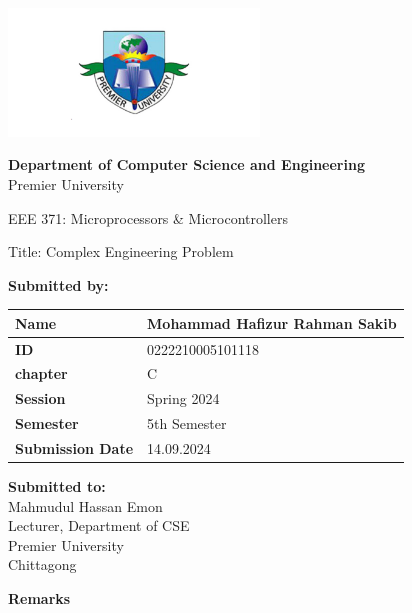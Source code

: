 \documentclass{scrreprt}
\renewcommand{\arraystretch}{1.5}
\begin{document}
\begin{titlepage}
    \centering
    \includegraphics[width=0.5\textwidth]{./logo.png} 
    \vspace{1cm}

    \textbf{Department of Computer Science and Engineering}\\
    Premier University
    \vspace{1cm}

    \huge \textnormal{EEE 371: Microprocessors \& Microcontrollers }
    \vspace{1in} 

    \Large \textnormal{Title: Complex Engineering Problem}
    \vspace{0.5in} 

    \large
    \textbf{Submitted by:}
    \vspace{0.5cm}

    \renewcommand{\arraystretch}{1.5} 
    \begin{tabular}{|p{}|p{}|}
        \hline
        \textbf{Name} & Mohammad Hafizur Rahman Sakib \\
        \hline
        \textbf{ID} & 0222210005101118 \\
        \hline
        \textbf{chapter} & C \\
        \hline
        \textbf{Session} & Spring 2024 \\
        \hline
        \textbf{Semester} & 5th Semester \\
        \hline
        \textbf{Submission Date} & 14.09.2024 \\
        \hline
    \end{tabular}
    \vspace{1cm}

    \begin{minipage}[t]{0.48\textwidth}
        \textbf{Submitted to:}\\
        Mahmudul Hassan Emon\\
        Lecturer, Department of CSE\\
        Premier University\\
        Chittagong
    \end{minipage}%
    \hfill
    \begin{minipage}[t]{0.48\textwidth}
        \raggedleft
        \textbf{Remarks}\\
        \vspace{0.5cm} %
    \end{minipage}

    \date{\today}
    \vfill
\end{titlepage}
\end{document}
